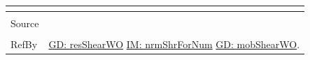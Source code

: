 \documentclass[12pt]{article}
\begin{document}
\begin{minipage}{\textwidth}
\begin{tabular}{p{} p{}}
\begin{symbDescription}
                                                  \end{symbDescription}
                                                  \\ \midrule \\
                                                  Source & \cite{fredlund1977}
                                                           \\ \midrule \\
                                                           RefBy & \hyperref[GD:resShearWO]{GD: resShearWO} \hyperref[IM:nrmShrForNum]{IM: nrmShrForNum} \hyperref[GD:mobShearWO]{GD: mobShearWO}.
\\ \bottomrule \end{tabular}
\end{minipage}
\par~
\end{document}
